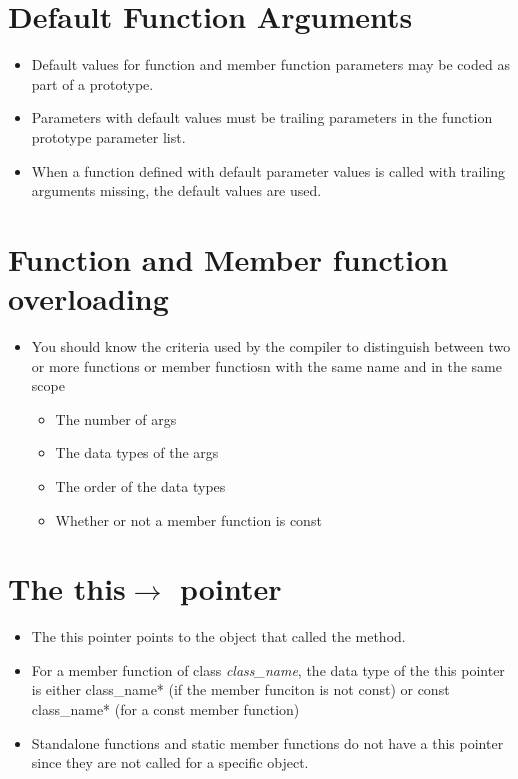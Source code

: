 \documentclass{report}
\begin{document}
    \section{Default Function Arguments}
    \begin{itemize}
      \item Default values for function and member function parameters may be coded as part of a prototype.
      \item Parameters with default values must be trailing parameters in the function prototype parameter list.
      \item When a function defined with default parameter values is called with trailing arguments missing, the default values are used.
    \end{itemize}
    \section{Function and Member function overloading}
    \begin{itemize}
      \item You should know the criteria used by the compiler to distinguish between two or more functions or member functiosn with the same name and in the same scope
    \begin{itemize}[label=$\circ$]
      \item The number of args
      \item The data types of the args
      \item The order of the data types
      \item Whether or not a member function is const
    \end{itemize}
    \end{itemize}
    \newpage
    \section{The this$\rightarrow$ pointer}
    \begin{itemize}
      \item The this pointer points to the object that called the method. 
      \item For a member function of class \textit{class\_name}, the data type of the this pointer is either class\_name* (if the member funciton is not const) or const class\_name* (for a  const member function)
      \item Standalone functions and static member functions do not have a this pointer since they are not called for a specific object.
    \end{itemize}
\end{document}
